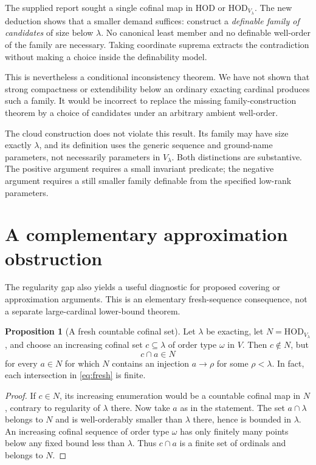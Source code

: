 \documentclass[11pt,letterpaper]{article}
\theoremstyle{definition}
\newtheorem{proposition}[definition]{Proposition}
\newcommand{\HOD}{\mathrm{HOD}}
\begin{document}
The supplied report sought a single cofinal map in HOD or
$\HOD_{V_\lambda}$.\cite[Section~5.4]{unified}
The new deduction shows that a smaller demand suffices: construct a
\emph{definable family of candidates} of size below $\lambda$.
No canonical least member and no definable well-order of the family are
necessary. Taking coordinate suprema extracts the contradiction without
making a choice inside the definability model.

This is nevertheless a conditional inconsistency theorem. We have not
shown that strong compactness or extendibility below an ordinary exacting
cardinal produces such a family. It would be incorrect to replace the
missing family-construction theorem by a choice of candidates under an
arbitrary ambient well-order.

The cloud construction does not violate this result. Its family may
have size exactly $\lambda$, and its definition uses the generic sequence
and ground-name parameters, not necessarily parameters in $V_\lambda$.
Both distinctions are substantive. The positive argument requires a
small invariant predicate; the negative argument requires a still smaller
family definable from the specified low-rank parameters.

\section{A complementary approximation obstruction}\label{sec:approximation}

The regularity gap also yields a useful diagnostic for proposed covering
or approximation arguments. This is an elementary fresh-sequence
consequence, not a separate large-cardinal lower-bound theorem.

\begin{proposition}[A fresh countable cofinal set]\label{prop:fresh}
Let $\lambda$ be exacting, let $N=\HOD_{V_\lambda}$, and choose an
increasing cofinal set $c\subseteq\lambda$ of order type $\omega$ in $V$.
Then $c\notin N$, but
\begin{equation}\label{eq:fresh}
 c\cap a\in N
\end{equation}
for every $a\in N$ for which $N$ contains an injection
$a\to\rho$ for some $\rho<\lambda$. In fact, each intersection in
\eqref{eq:fresh} is finite.
\end{proposition}

\begin{proof}
If $c\in N$, its increasing enumeration would be a countable cofinal
map in $N$, contrary to regularity of $\lambda$ there. Now take $a$
as in the statement. The set $a\cap\lambda$ belongs to $N$ and is
well-orderably smaller than $\lambda$ there, hence is bounded in
$\lambda$. An increasing cofinal sequence of order type $\omega$ has
only finitely many points below any fixed bound less than $\lambda$.
Thus $c\cap a$ is a finite set of ordinals and belongs to $N$.
\end{proof}
\end{document}
